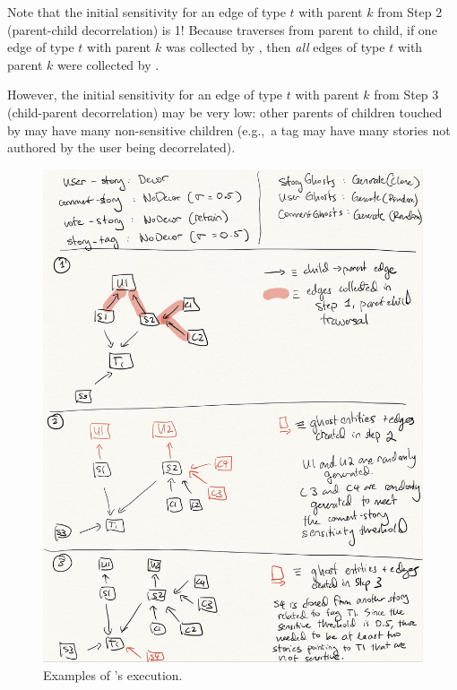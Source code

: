Note that the initial sensitivity for an edge of type $t$ with parent $k$ from Step 2 (parent-child
decorrelation) is 1! Because \sys{} traverses from parent to child, if one edge of type $t$ with
parent $k$ was collected by \sys{}, then \emph{all} edges of type $t$ with parent $k$ were collected
by \sys{}. 

However, the initial sensitivity for an edge of type $t$ with parent $k$ from Step 3 (child-parent
decorrelation) may be very low: other parents of children touched by \sys{} may have many
non-sensitive children (e.g.,\ a tag may have many stories not authored by the user being
decorrelated).

\begin{figure}[t!]
    \includegraphics[width=.5\textwidth]{img/algo}
    \caption{Examples of \sys{}'s execution.}
\end{figure}

%


